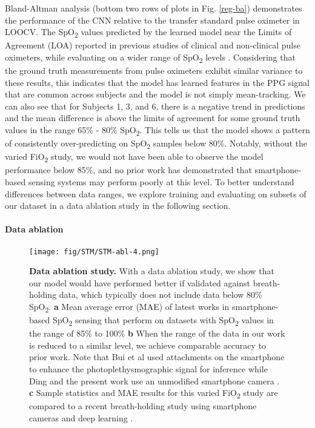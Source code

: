 \documentclass[12pt]{article}
\begin{document}
Bland-Altman analysis (bottom two rows of plots in Fig. \ref{reg-ba}) demonstrates the performance of the CNN relative to the transfer standard pulse oximeter in LOOCV.
The SpO\textsubscript{2} values predicted by the learned model near the Limits of Agreement (LOA) reported in previous studies of clinical and non-clinical pulse oximeters, while evaluating on a wider range of SpO\textsubscript{2} levels \cite{luks2020pulse,kelly2001accurate,munoz2008accuracy,lipnick2016accuracy}.  Considering that the ground truth measurements from pulse oximeters exhibit similar variance to these results, this indicates that the model has learned features in the PPG signal that are common across subjects and the model is not simply mean-tracking.
We can also see that for Subjects 1, 3, and 6, there is a negative trend in predictions and the mean difference is above the limits of agreement for some ground truth values in the range 65\% - 80\% SpO\textsubscript{2}. This tells us that the model shows a pattern of consistently over-predicting on SpO\textsubscript{2} samples below 80\%. Notably, without the varied FiO\textsubscript{2} study, we would not have been able to observe the model performance below 85\%, and no prior work has demonstrated that smartphone-based sensing systems may perform poorly at this level. To better understand differences between data ranges, we explore training and evaluating on subsets of our dataset in a data ablation study in the following section.

\label{sec:Data ablation}
\paragraph*{Data ablation}

\begin{figure}[!ht] 
\texttt{[image: fig/STM/STM-abl-4.png]}
\caption{\textbf{Data ablation study.} With a data ablation study, we show that our model would have performed better if validated against breath-holding data, which typically does not include data below 80\% SpO\textsubscript{2}. \textbf{a} Mean average error (MAE) of latest works in smartphone-based SpO\textsubscript{2} sensing that perform on datasets with SpO\textsubscript{2} values in the range of 85\% to 100\% \textbf{b} When the range of the data in our work is reduced to a similar level, we achieve comparable accuracy to prior work.  Note that Bui et al used attachments on the smartphone to enhance the photoplethysmographic signal for inference while Ding and the present work use an unmodified smartphone camera \cite{ding2018measuring,bui2020smartphone,carni2016setting}. \textbf{c} Sample statistics and MAE results for this varied FiO\textsubscript{2} study are compared to a recent breath-holding study using smartphone cameras and deep learning \cite{ding2018measuring}.}
\label{abl}
\end{figure}
\end{document}
